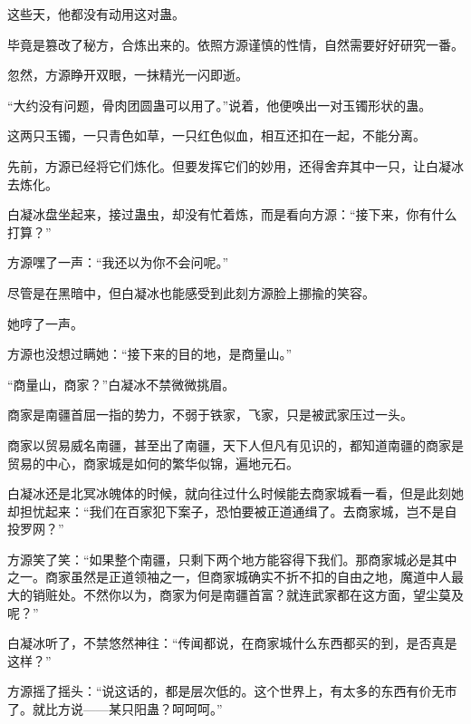 \begin{this_body}
这些天，他都没有动用这对蛊。

毕竟是篡改了秘方，合炼出来的。依照方源谨慎的性情，自然需要好好研究一番。

忽然，方源睁开双眼，一抹精光一闪即逝。

“大约没有问题，骨肉团圆蛊可以用了。”说着，他便唤出一对玉镯形状的蛊。

这两只玉镯，一只青色如草，一只红色似血，相互还扣在一起，不能分离。

先前，方源已经将它们炼化。但要发挥它们的妙用，还得舍弃其中一只，让白凝冰去炼化。

白凝冰盘坐起来，接过蛊虫，却没有忙着炼，而是看向方源：“接下来，你有什么打算？”

方源嘿了一声：“我还以为你不会问呢。”

尽管是在黑暗中，但白凝冰也能感受到此刻方源脸上挪揄的笑容。

她哼了一声。

方源也没想过瞒她：“接下来的目的地，是商量山。”

“商量山，商家？”白凝冰不禁微微挑眉。

商家是南疆首屈一指的势力，不弱于铁家，飞家，只是被武家压过一头。

商家以贸易威名南疆，甚至出了南疆，天下人但凡有见识的，都知道南疆的商家是贸易的中心，商家城是如何的繁华似锦，遍地元石。

白凝冰还是北冥冰魄体的时候，就向往过什么时候能去商家城看一看，但是此刻她却担忧起来：“我们在百家犯下案子，恐怕要被正道通缉了。去商家城，岂不是自投罗网？”

方源笑了笑：“如果整个南疆，只剩下两个地方能容得下我们。那商家城必是其中之一。商家虽然是正道领袖之一，但商家城确实不折不扣的自由之地，魔道中人最大的销赃处。不然你以为，商家为何是南疆首富？就连武家都在这方面，望尘莫及呢？”

白凝冰听了，不禁悠然神往：“传闻都说，在商家城什么东西都买的到，是否真是这样？”

方源摇了摇头：“说这话的，都是层次低的。这个世界上，有太多的东西有价无市了。就比方说——某只阳蛊？呵呵呵。”

\end{this_body}


